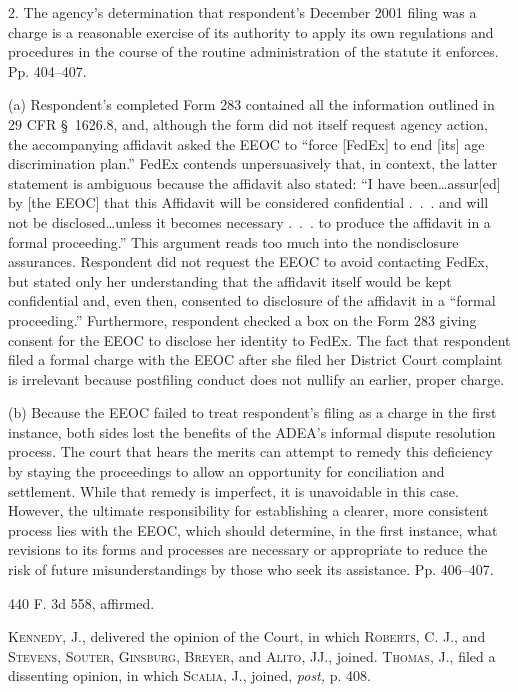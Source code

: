   2. The agency's determination that respondent's December 2001
filing was a charge is a reasonable exercise of its authority to
apply its own regulations and procedures in the course of the routine
administration of the statute it enforces. Pp. 404--407.

    (a) Respondent's completed Form 283 contained all the information
outlined in 29 CFR \S~1626.8, and, although the form did not itself
request agency action, the accompanying affidavit asked the EEOC to
``force [FedEx] to end [its] age discrimination plan.'' FedEx contends
unpersuasively that, in context, the latter statement is ambiguous
because the affidavit also stated: ``I have been\dots assur[ed] by
[the EEOC] that this Affidavit will be considered confidential .~.~.
and will not be disclosed\dots unless it becomes necessary .~.~.
to produce the affidavit in a formal proceeding.'' This argument reads
too much into the nondisclosure assurances. Respondent did not request
the EEOC to avoid contacting FedEx, but stated only her understanding
that the affidavit itself would be kept confidential and, even then,
consented to disclosure of the affidavit in a ``formal proceeding.''
Furthermore, respondent checked a box on the Form 283 giving consent for
the EEOC to disclose her identity to FedEx. The fact that respondent
filed a formal charge with the EEOC after she filed her District Court
complaint is irrelevant because postfiling conduct does not nullify an
earlier, proper charge.\newpage 

  (b) Because the EEOC failed to treat respondent's filing as a charge
in the first instance, both sides lost the benefits of the ADEA's
informal dispute resolution process. The court that hears the merits
can attempt to remedy this deficiency by staying the proceedings to
allow an opportunity for conciliation and settlement. While that remedy
is imperfect, it is unavoidable in this case. However, the ultimate
responsibility for establishing a clearer, more consistent process
lies with the EEOC, which should determine, in the first instance,
what revisions to its forms and processes are necessary or appropriate
to reduce the risk of future misunderstandings by those who seek its
assistance. Pp. 406--407.

440 F. 3d 558, affirmed.

  \textsc{Kennedy,} J., delivered the opinion of the Court, in which
\textsc{Roberts,} C. J., and \textsc{Stevens, Souter, Ginsburg, Breyer,} and
\textsc{Alito,} JJ., joined. \textsc{Thomas,} J., filed a dissenting opinion, in
which \textsc{Scalia,} J., joined, \emph{post,} p. 408.

